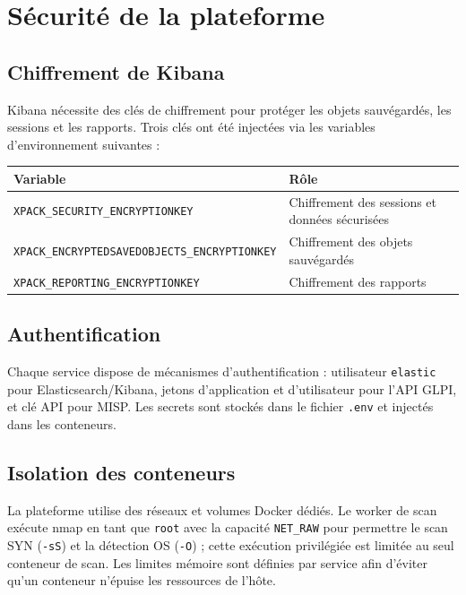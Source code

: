 \section{S\'ecurit\'e de la plateforme}

\subsection{Chiffrement de Kibana}

Kibana n\'ecessite des cl\'es de chiffrement pour prot\'eger les objets
sauv\'egard\'es, les sessions et les rapports. Trois cl\'es ont \'et\'e
inject\'ees via les variables d'environnement suivantes :

\begin{center}
\small
\begin{tabularx}{\linewidth}{@{}l X@{}}
\toprule
\textbf{Variable} & \textbf{R\^ole} \\
\midrule
\texttt{XPACK\_SECURITY\_ENCRYPTIONKEY} & Chiffrement des sessions et donn\'ees s\'ecuris\'ees \\
\texttt{XPACK\_ENCRYPTEDSAVEDOBJECTS\_ENCRYPTIONKEY} & Chiffrement des objets sauv\'egard\'es \\
\texttt{XPACK\_REPORTING\_ENCRYPTIONKEY} & Chiffrement des rapports \\
\bottomrule
\end{tabularx}
\end{center}

\subsection{Authentification}

Chaque service dispose de m\'ecanismes d'authentification : utilisateur
\texttt{elastic} pour Elasticsearch/Kibana, jetons d'application et
d'utilisateur pour l'API GLPI, et cl\'e API pour MISP. Les secrets sont
stock\'es dans le fichier \texttt{.env} et inject\'es dans les conteneurs.

\subsection{Isolation des conteneurs}

La plateforme utilise des r\'eseaux et volumes Docker d\'edi\'es. Le worker
de scan ex\'ecute nmap en tant que \texttt{root} avec la capacit\'e
\texttt{NET\_RAW} pour permettre le scan SYN (\texttt{-sS}) et la d\'etection
OS (\texttt{-O}) ; cette ex\'ecution privil\'egi\'ee est limit\'ee au seul
conteneur de scan. Les limites m\'emoire sont d\'efinies par service afin
d'\'eviter qu'un conteneur n'\'epuise les ressources de l'h\^ote.

